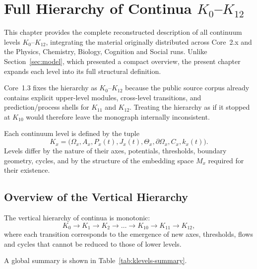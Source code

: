 
\section{Full Hierarchy of Continua \texorpdfstring{\texorpdfstring{$K_0$}{K\_0}–$K_{12}$}{K0–K12}}
\label{sec:klevels-full}

This chapter provides the complete reconstructed description of all
continuum levels \(K_0\)–\(K_{12}\), integrating the material originally
distributed across Core~2.x and the Physics, Chemistry, Biology, Cognition
and Social runs.
Unlike Section~\ref{sec:model}, which presented a compact overview, the
present chapter expands each level into its full structural definition.

Core~1.3 fixes the hierarchy as \(K_0\)–\(K_{12}\) because the public source
corpus already contains explicit upper-level modules, cross-level transitions,
and prediction/process shells for \(K_{11}\) and \(K_{12}\).
Treating the hierarchy as if it stopped at \(K_{10}\) would therefore leave the
monograph internally inconsistent.

Each continuum level is defined by the tuple
\[
    K_x = \big(\Omega_x, A_x, P_x(t), J_x(t), \Theta_x,
           \partial\Omega_x, C_x, k_x(t)\big).
\]
Levels differ by the nature of their axes, potentials, thresholds,
boundary geometry, cycles, and by the structure of the embedding space
\(M_x\) required for their existence.


\subsection{Overview of the Vertical Hierarchy}

The vertical hierarchy of continua is monotonic:
\[
    K_0 \rightarrow K_1 \rightarrow K_2 \rightarrow \dots
    \rightarrow K_{10} \rightarrow K_{11} \rightarrow K_{12},
\]
where each transition corresponds to the emergence of new axes,
thresholds, flows and cycles that cannot be reduced to those of lower
levels.

A global summary is shown in Table~\ref{tab:klevels-summary}.

